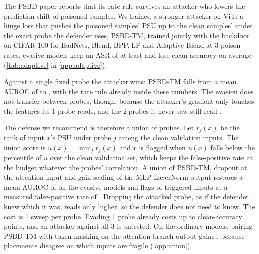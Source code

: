 The PSBD paper reports that its rate rule survives an attacker who lowers the prediction shift of poisoned samples. We trained a stronger attacker on ViT: a hinge loss that pushes the poisoned samples' PSU up to the clean samples' under the exact probe the defender uses, PSBD-TM, trained jointly with the backdoor on CIFAR-100 for BadNets, Blend, BPP, LF and Adaptive-Blend at 3 poison rates. \AdaptiveVitCells{} evasive models keep an ASR of at least \AdaptiveHighAsr{} and lose \AdaptiveVitCaCost{} clean accuracy on average (\cref{tab:adaptive} in \cref{app:adaptive}).

Against a single fixed probe the attacker wins: PSBD-TM falls from a mean AUROC of \AdaptiveVitProbedBase{} to \AdaptiveVitProbedEvade{}, with the rate rule already inside these numbers. The evasion does not transfer between probes, though, because the attacker's gradient only touches the features its 1 probe reads, and the 2 probes it never saw still read \AdaptiveVitTransfer{}.

The defense we recommend is therefore a union of probes. Let $r_j(x)$ be the rank of input $x$'s PSU under probe $j$ among the clean validation inputs. The union score is $u(x) = \min_j r_j(x)$ and $x$ is flagged when $u(x)$ falls below the \HeadlineQuantilePercent{} percentile of $u$ over the clean validation set, which keeps the false-positive rate at the budget whatever the probes' correlation. A union of PSBD-TM, dropout at the attention input and gain scaling of the MLP LayerNorm output restores a mean AUROC of \AdaptiveVitUnion{} on the evasive models and flags \AdaptiveVitUnionTpr{} of triggered inputs at a measured false-positive rate of \AdaptiveVitUnionFpr{}. Dropping the attacked probe, as if the defender knew which it was, reads only \AdaptiveVitOracleGap{} higher, so the defender does not need to know. The cost is 1 sweep per probe. Evading 1 probe already costs up to \AdaptiveVitCaCostMaxPoints{} clean-accuracy points, and an attacker against all 3 is untested. On the ordinary models, pairing PSBD-TM with token masking on the attention branch output gains \ProbeUnionTmBranchGain{}, because placements disagree on which inputs are fragile (\cref{app:union}).
